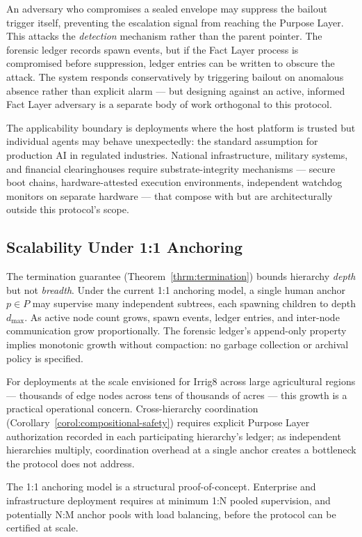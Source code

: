 An adversary who compromises a sealed envelope may suppress the bailout trigger itself, preventing the escalation signal from reaching the Purpose Layer. This attacks the \emph{detection} mechanism rather than the parent pointer. The forensic ledger records spawn events, but if the Fact Layer process is compromised before suppression, ledger entries can be written to obscure the attack. The system responds conservatively by triggering bailout on anomalous absence rather than explicit alarm — but designing against an active, informed Fact Layer adversary is a separate body of work orthogonal to this protocol.

The applicability boundary is deployments where the host platform is trusted but individual agents may behave unexpectedly: the standard assumption for production AI in regulated industries. National infrastructure, military systems, and financial clearinghouses require substrate-integrity mechanisms — secure boot chains, hardware-attested execution environments, independent watchdog monitors on separate hardware — that compose with but are architecturally outside this protocol's scope.

\subsection{Scalability Under 1:1 Anchoring}
\label{sec:limitations-scalability}

The termination guarantee (Theorem~\ref{thrm:termination}) bounds hierarchy \emph{depth} but not \emph{breadth}. Under the current 1:1 anchoring model, a single human anchor $p \in P$ may supervise many independent subtrees, each spawning children to depth $d_{\max}$. As active node count grows, spawn events, ledger entries, and inter-node communication grow proportionally. The forensic ledger's append-only property implies monotonic growth without compaction: no garbage collection or archival policy is specified.

For deployments at the scale envisioned for Irrig8 across large agricultural regions — thousands of edge nodes across tens of thousands of acres — this growth is a practical operational concern. Cross-hierarchy coordination (Corollary~\ref{corol:compositional-safety}) requires explicit Purpose Layer authorization recorded in each participating hierarchy's ledger; as independent hierarchies multiply, coordination overhead at a single anchor creates a bottleneck the protocol does not address.

The 1:1 anchoring model is a structural proof-of-concept. Enterprise and infrastructure deployment requires at minimum 1:N pooled supervision, and potentially N:M anchor pools with load balancing, before the protocol can be certified at scale.

